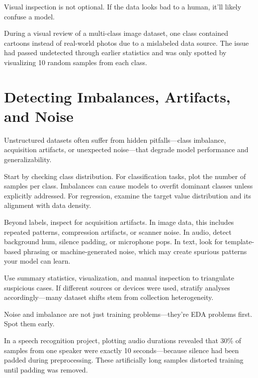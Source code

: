 \documentclass[12pt,openany]{book}
\begin{document}
Visual inspection is not optional. If the data looks bad to a human, it’ll likely confuse a model.

\begin{examplebox}
During a visual review of a multi-class image dataset, one class contained cartoons instead of real-world photos due to a mislabeled data source. The issue had passed undetected through earlier statistics and was only spotted by visualizing 10 random samples from each class.
\end{examplebox}



\section{Detecting Imbalances, Artifacts, and Noise}

Unstructured datasets often suffer from hidden pitfalls—class imbalance, acquisition artifacts, or unexpected noise—that degrade model performance and generalizability.
\newline

Start by checking class distribution. For classification tasks, plot the number of samples per class. Imbalances can cause models to overfit dominant classes unless explicitly addressed. For regression, examine the target value distribution and its alignment with data density.
\newline

Beyond labels, inspect for acquisition artifacts. In image data, this includes repeated patterns, compression artifacts, or scanner noise. In audio, detect background hum, silence padding, or microphone pops. In text, look for template-based phrasing or machine-generated noise, which may create spurious patterns your model can learn.
\newline

Use summary statistics, visualization, and manual inspection to triangulate suspicious cases. If different sources or devices were used, stratify analyses accordingly—many dataset shifts stem from collection heterogeneity.
\newline

Noise and imbalance are not just training problems—they're EDA problems first. Spot them early.

\begin{examplebox}
In a speech recognition project, plotting audio durations revealed that 30\% of samples from one speaker were exactly 10 seconds—because silence had been padded during preprocessing. These artificially long samples distorted training until padding was removed.
\end{examplebox}
\end{document}
